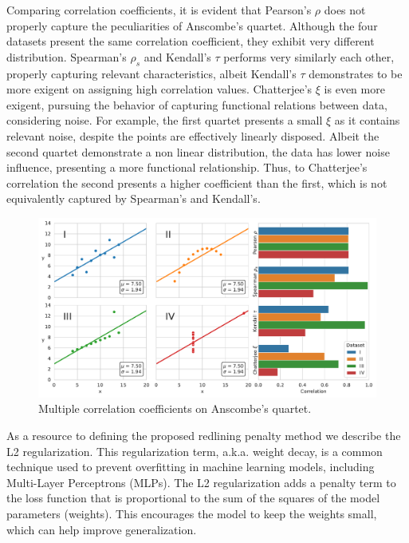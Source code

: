Comparing correlation coefficients, it is evident that Pearson's $\rho$ does not properly capture the peculiarities of Anscombe's quartet. Although the four datasets present the same correlation coefficient, they exhibit very different distribution. Spearman's $\rho_s$ and Kendall's $\tau$ performs very similarly each other, properly capturing relevant characteristics, albeit Kendall's $\tau$ demonstrates to be more exigent on assigning high correlation values. Chatterjee's $\xi$ is even more exigent, pursuing the behavior of capturing functional relations between data, considering noise. For example, the first quartet presents a small $\xi$ as it contains relevant noise, despite the points are effectively linearly disposed. Albeit the second quartet demonstrate a non linear distribution, the data has lower noise influence, presenting a more functional relationship. Thus, to Chatterjee's correlation the second presents a higher coefficient than the first, which is not equivalently captured by Spearman's and Kendall's. 
\begin{figure}[!ht]
\centering
\caption{Multiple correlation coefficients on Anscombe's quartet.}\label{fig:anscombe}
    \includegraphics[width=1\linewidth]{images/anscombe_quartet.pdf}
\end{figure}



As a resource to defining the proposed redlining penalty method we describe the L2 regularization. This regularization term, a.k.a. weight decay, is a common technique used to prevent overfitting in machine learning models, including Multi-Layer Perceptrons (MLPs). The L2 regularization adds a penalty term to the loss function that is proportional to the sum of the squares of the model parameters (weights). This encourages the model to keep the weights small, which can help improve generalization.

